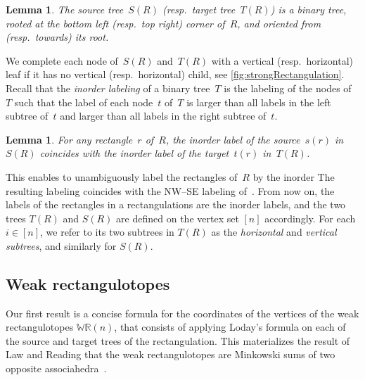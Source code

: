 \documentclass{amsart}
\newtheorem{lemma}[theorem]{Lemma}
\theoremstyle{definition}
\newcommand{\darkblue}{\color{darkblue}} %
\newcommand{\defn}[1]{\textsl{\darkblue #1}} %
\newcommand{\polytope}[1]{\mathds{#1}} %
\newcommand{\WRP}{\polytope{WR}} %
\begin{document}
\begin{lemma}
The source tree~$S(R)$ (resp.~target tree~$T(R)$) is a binary tree, rooted at the bottom left (resp.~top right) corner of~$R$, and oriented from (resp.~towards) its root.
\end{lemma}

We complete each node of~$S(R)$ and~$T(R)$ with a vertical (resp.~horizontal) leaf if it has no vertical (resp.~horizontal) child, see \cref{fig:strongRectangulation}.
Recall that the \defn{inorder labeling} of a binary tree~$T$ is the labeling of the nodes of~$T$ such that the label of each node~$t$ of~$T$ is larger than all labels in the left subtree of~$t$ and larger than all labels in the right subtree of~$t$.

\begin{lemma}
For any rectangle~$r$ of~$R$, the inorder label of the source~$s(r)$ in~$S(R)$ coincides with the inorder label of the target~$t(r)$ in~$T(R)$.
\end{lemma}

This enables to unambiguously label the rectangles of~$R$ by the inorder 
The resulting labeling coincides with the NW--SE labeling of~\cite{ACFF24}.
From now on, the labels of the rectangles in a rectangulations are the inorder labels, and the two trees $T(R)$ and $S(R)$ are defined on the vertex set $[n]$ accordingly.
For each $i\in [n]$, we refer to its two subtrees in $T(R)$ as the \defn{horizontal} and \defn{vertical subtrees}, and similarly for $S(R)$. 

\subsection{Weak rectangulotopes}

Our first result is a concise formula for the coordinates of the vertices of the  weak rectangulotopes $\WRP(n)$, that consists of applying Loday's formula on each of the source and target trees of the rectangulation. This materializes the result of Law and Reading that the weak rectangulotopes are Minkowski sums of two opposite associahedra~\cite{MR2871762}.
\end{document}
